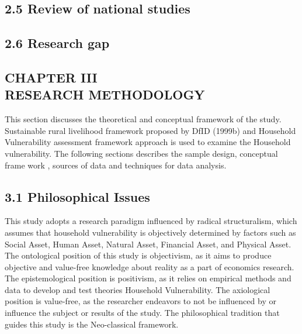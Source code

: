 \documentclass[12pt]{report}
\begin{document}
\subsection*{2.5 Review of national studies}
\renewcommand{\thepage}{\arabic{page}}

\vspace{2cm}

\subsection*{2.6 Research gap}
\renewcommand{\thepage}{\arabic{page}}

\vspace{2cm}


\clearpage
\begin{center}
\section*{CHAPTER III \\ RESEARCH METHODOLOGY }
\end{center}
\renewcommand{\thepage}{\arabic{page}}
\setcounter{page}{4}
\vspace{1cm}
This section discusses the theoretical and conceptual framework of the study. Sustainable rural livelihood framework proposed by  DfID (1999b) and Household Vulnerability assessment framework approach is used to examine the Household vulnerability. The following sections describes the sample design, conceptual frame work , sources of data and techniques for data analysis. \par
\vspace{1cm}
\subsection*{3.1  Philosophical Issues}
\renewcommand{\thepage}{\arabic{page}}

This study adopts a research paradigm influenced by radical structuralism, which assumes that household vulnerability is objectively determined by factors such as Social Asset, Human Asset, Natural Asset, Financial Asset, and Physical Asset. The ontological position of this study is objectivism, as it aims to produce objective and value-free knowledge about reality as a part of economics research. The epistemological position is positivism, as it relies on empirical methods and data to develop and test theories Household Vulnerability. The axiological position is value-free, as the researcher endeavors to not be influenced by or influence the subject or results of the study. The philosophical tradition that guides this study is the Neo-classical framework.\par
\end{document}
